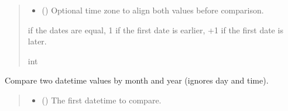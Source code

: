 \documentclass[letterpaper,10pt,english]{sphinxmanual}
\begin{document}
\begin{fulllineitems}
\begin{fulllineitems}
\begin{quote}
\begin{description}
\begin{itemize}
\item {} 
\sphinxAtStartPar
{} (\sphinxstyleliteralemphasis{\sphinxupquote{{[}}}\sphinxstyleliteralemphasis{\sphinxupquote{{]}}}) \textendash{} Optional time zone to align both values before comparison.

\end{itemize}

 if the dates are equal,
\sphinxhyphen{}1 if the first date is earlier,
+1 if the first date is later.

\sphinxAtStartPar
int

\end{description}\end{quote}

\end{fulllineitems}


\begin{fulllineitems}
\label{\detokenize{apache_commons_validator_python.routines:apache_commons_validator_python.routines.date_validator.DateValidator.compare_months}}
\pysigstartsignatures
{}
\pysigstopsignatures
\sphinxAtStartPar
Compare two datetime values by month and year (ignores day and time).
\begin{quote}\begin{description}
\begin{itemize}
\item {} 
\sphinxAtStartPar
{} () \textendash{} The first datetime to compare.


\end{itemize}
\end{description}
\end{quote}
\end{fulllineitems}
\end{fulllineitems}
\end{document}
